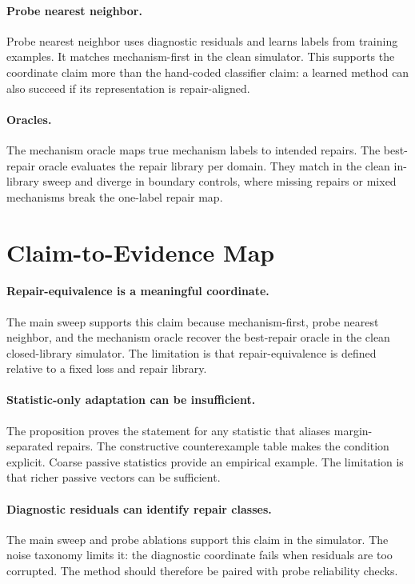 \documentclass{article}
\begin{document}
\paragraph{Probe nearest neighbor.}
Probe nearest neighbor uses diagnostic residuals and learns labels from training
examples. It matches mechanism-first in the clean simulator. This supports the
coordinate claim more than the hand-coded classifier claim: a learned method can
also succeed if its representation is repair-aligned.

\paragraph{Oracles.}
The mechanism oracle maps true mechanism labels to intended repairs. The
best-repair oracle evaluates the repair library per domain. They match in the
clean in-library sweep and diverge in boundary controls, where missing repairs
or mixed mechanisms break the one-label repair map.

\section{Claim-to-Evidence Map}

\paragraph{Repair-equivalence is a meaningful coordinate.}
The main sweep supports this claim because mechanism-first, probe nearest
neighbor, and the mechanism oracle recover the best-repair oracle in the clean
closed-library simulator. The limitation is that repair-equivalence is defined
relative to a fixed loss and repair library.

\paragraph{Statistic-only adaptation can be insufficient.}
The proposition proves the statement for any statistic that aliases
margin-separated repairs. The constructive counterexample table makes the
condition explicit. Coarse passive statistics provide an empirical example. The
limitation is that richer passive vectors can be sufficient.

\paragraph{Diagnostic residuals can identify repair classes.}
The main sweep and probe ablations support this claim in the simulator. The
noise taxonomy limits it: the diagnostic coordinate fails when residuals are too
corrupted. The method should therefore be paired with probe reliability checks.
\end{document}
